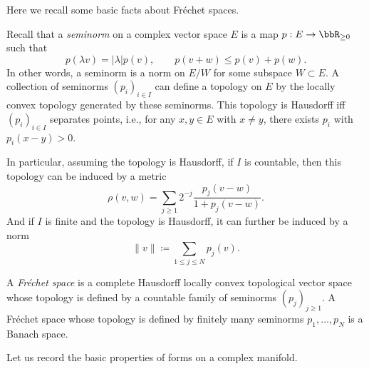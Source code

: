 \begin{remark}[label=\labelNFM{rmk:recall-Frechet-space}, status=draft, tag=0000000]
	Here we recall some basic facts about Fr\'echet spaces.

	Recall that a \emph{seminorm} on a complex vector space $E$ is a map $p:E \to \bbR_{ \geq 0}$ such that
	\[
		p(\lambda v) = |\lambda|p(v),\qquad p(v+w) \leq p(v)+p(w).
	\]
	In other words, a seminorm is a norm on $E/W$ for some subspace $W \subset E$.
	A collection of seminorms $(p_i)_{i \in I}$ can define a topology on $E$ by the locally convex topology generated by these seminorms.
	This topology is Hausdorff iff $(p_i)_{i \in I}$ separates points, i.e., for any $x,y \in E$ with $x \neq y$, there exists $p_i$ with $p_i(x-y) > 0$.

	In particular, assuming the topology is Hausdorff, if $I$ is countable, then this topology can be induced by a metric
	\[
		\rho(v,w) = \sum_{j \geq 1}2^{-j} \frac{p_j(v-w)}{1+p_j(v-w)}.
	\]
	And if $I$ is finite and the topology is Hausdorff, it can further be induced by a norm
	\[ \|v\| \coloneqq \sum_{1 \leq j \leq N}p_j(v). \]

	A \emph{Fr\'echet space} is a complete Hausdorff locally convex topological vector space whose topology is defined by a countable family of seminorms $(p_j)_{j \geq 1}$.
	A Fr\'echet space whose topology is defined by finitely many seminorms $p_1,\ldots,p_N$ is a Banach space.
\end{remark}

Let us record the basic properties of forms on a complex manifold.

